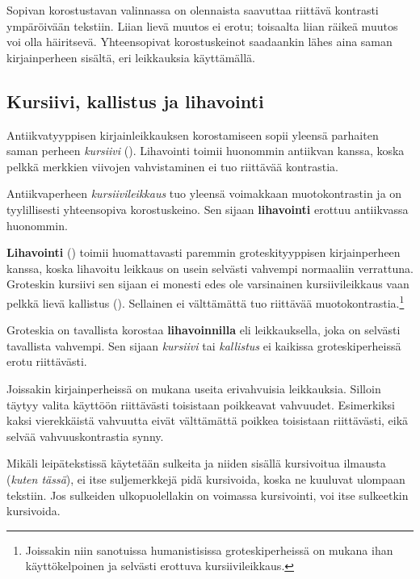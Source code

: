 Sopivan korostustavan valinnassa on olennaista saavuttaa riittävä
kontrasti ympäröivään tekstiin. Liian lievä muutos ei erotu; toisaalta
liian räikeä muutos voi olla häiritsevä. Yhteensopivat korostuskeinot
saadaankin lähes aina saman kirjainperheen sisältä, eri leikkauksia
käyttämällä.

\subsection{Kursiivi, kallistus ja lihavointi}
\label{luku/peruskorostukset}

Antiikvatyyppisen kirjainleikkauksen korostamiseen sopii yleensä
parhaiten saman perheen \textit{kursiivi} ().
Lihavointi toimii huonommin antiikvan kanssa, koska pelkkä merkkien
viivojen vahvistaminen ei tuo riittävää kontrastia.

\begin{tulossis}
  \rmfamily Antiikvaperheen \textit{kursiivileikkaus} tuo yleensä
  voimakkaan muotokontrastin ja on tyylillisesti yhteensopiva
  korostuskeino. Sen sijaan \textbf{lihavointi} erottuu antiikvassa
  huonommin.
\end{tulossis}

\noindent
\textbf{Lihavointi} () toimii huomattavasti paremmin
groteskityyppisen kirjainperheen kanssa, koska lihavoitu leikkaus on
usein selvästi vahvempi normaaliin verrattuna. Groteskin kursiivi sen
sijaan ei monesti edes ole varsinainen kursiivileikkaus vaan pelkkä
lievä kallistus (). Sellainen ei välttämättä tuo
riittävää muotokontrastia.\footnote{Joissakin niin sanotuissa
  humanistisissa groteskiperheissä on mukana ihan käyttökelpoinen ja
  selvästi erottuva kursiivileikkaus.}

\begin{tulossis}
  \sffamily Groteskia on tavallista korostaa \textbf{lihavoinnilla} eli
  leikkauksella, joka on selvästi tavallista vahvempi. Sen sijaan
  \textit{kursiivi} tai \textsl{kallistus} ei kaikissa groteskiperheissä
  erotu riittävästi.
\end{tulossis}

\noindent
Joissakin kirjainperheissä on mukana useita erivahvuisia leikkauksia.
Silloin täytyy valita käyttöön riittävästi toisistaan poikkeavat
vahvuudet. Esimerkiksi kaksi vierekkäistä vahvuutta eivät välttämättä
poikkea toisistaan riittävästi, eikä selvää vahvuuskontrastia synny.

Mikäli leipätekstissä käytetään sulkeita ja niiden sisällä kursivoitua
ilmausta (\textit{kuten tässä}), ei itse suljemerkkejä pidä kursivoida,
koska ne kuuluvat ulompaan tekstiin. Jos sulkeiden ulkopuolellakin on
voimassa kursivointi, voi itse sulkeetkin kursivoida.

